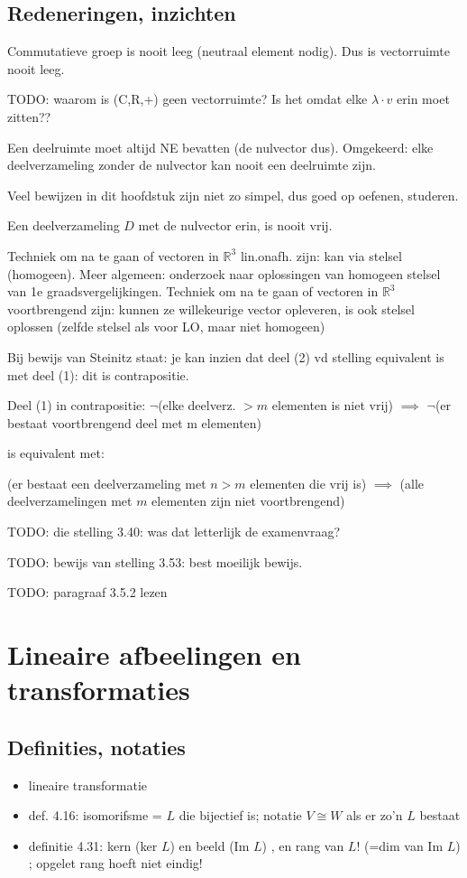 \documentclass{article}
\begin{document}
\subsection{Redeneringen, inzichten}

Commutatieve groep is nooit leeg (neutraal element nodig). Dus is vectorruimte nooit leeg. 

TODO: waarom is (C,R,+) geen vectorruimte? Is het omdat elke $\lambda \cdot v$ erin moet zitten?? 

Een deelruimte moet altijd NE bevatten (de nulvector dus). Omgekeerd: elke deelverzameling zonder de nulvector kan nooit een deelruimte zijn. 

Veel bewijzen in dit hoofdstuk zijn niet zo simpel, dus goed op oefenen, studeren. 

Een deelverzameling $D$ met de nulvector erin, is nooit vrij. 

Techniek om na te gaan of vectoren in $\mathbb{R}^3$ lin.onafh. zijn: kan via stelsel (homogeen). Meer algemeen: onderzoek naar oplossingen van homogeen stelsel van 1e graadsvergelijkingen. 
Techniek om na te gaan of vectoren in $\mathbb{R}^3$ voortbrengend zijn: kunnen ze willekeurige vector opleveren, is ook stelsel oplossen (zelfde stelsel als voor LO, maar niet homogeen) 

Bij bewijs van Steinitz staat: je kan inzien dat deel (2) vd stelling equivalent is met deel (1): dit is contrapositie. 

Deel (1) in contrapositie: 
$\neg$(elke deelverz. $> m$ elementen is niet vrij) $\implies$ $\neg$(er bestaat voortbrengend deel met m elementen)

is equivalent met: 

(er bestaat een deelverzameling met $n>m$ elementen die vrij is) $\implies$ (alle deelverzamelingen met $m$ elementen zijn niet voortbrengend)

TODO: die stelling 3.40: was dat letterlijk de examenvraag? 

TODO: bewijs van stelling 3.53: best moeilijk bewijs. 

TODO: paragraaf 3.5.2 lezen 

\section{Lineaire afbeelingen en transformaties}

\subsection{Definities, notaties}
\begin{itemize}
    \item lineaire transformatie
    \item def. 4.16: isomorifsme = $L$ die bijectief is; notatie $V \cong W$ als er zo'n $L$ bestaat
    \item definitie 4.31: kern (ker $L$) en beeld (Im $L$) , en rang van $L$! (=dim van Im $L$) ; opgelet rang hoeft niet eindig! 
\end{itemize}
\end{document}

